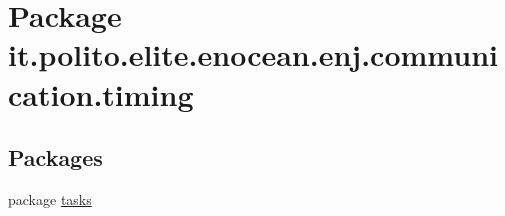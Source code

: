 \hypertarget{namespaceit_1_1polito_1_1elite_1_1enocean_1_1enj_1_1communication_1_1timing}{}\section{Package it.\+polito.\+elite.\+enocean.\+enj.\+communication.\+timing}
\label{namespaceit_1_1polito_1_1elite_1_1enocean_1_1enj_1_1communication_1_1timing}
\subsection*{Packages}
\begin{DoxyCompactItemize}
\item 
package \hyperlink{namespaceit_1_1polito_1_1elite_1_1enocean_1_1enj_1_1communication_1_1timing_1_1tasks}{tasks}
\end{DoxyCompactItemize}
